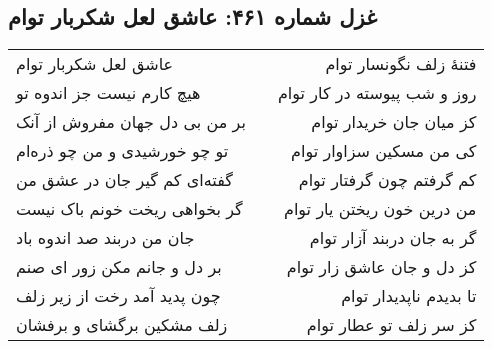 \begin{center}
\section*{غزل شماره ۴۶۱: عاشق لعل شکربار توام}
\label{sec:461}
\begin{longtable}{l p{0.5cm} r}
عاشق لعل شکربار توام
&&
فتنهٔ زلف نگونسار توام
\\
هیچ کارم نیست جز اندوه تو
&&
روز و شب پیوسته در کار توام
\\
بر من بی دل جهان مفروش از آنک
&&
کز میان جان خریدار توام
\\
تو چو خورشیدی و من چو ذره‌ام
&&
کی من مسکین سزاوار توام
\\
گفته‌ای کم گیر جان در عشق من
&&
کم گرفتم چون گرفتار توام
\\
گر بخواهی ریخت خونم باک نیست
&&
من درین خون ریختن یار توام
\\
جان من دربند صد اندوه باد
&&
گر به جان دربند آزار توام
\\
بر دل و جانم مکن زور ای صنم
&&
کز دل و جان عاشق زار توام
\\
چون پدید آمد رخت از زیر زلف
&&
تا بدیدم ناپدیدار توام
\\
زلف مشکین برگشای و برفشان
&&
کز سر زلف تو عطار توام
\\
\end{longtable}
\end{center}
